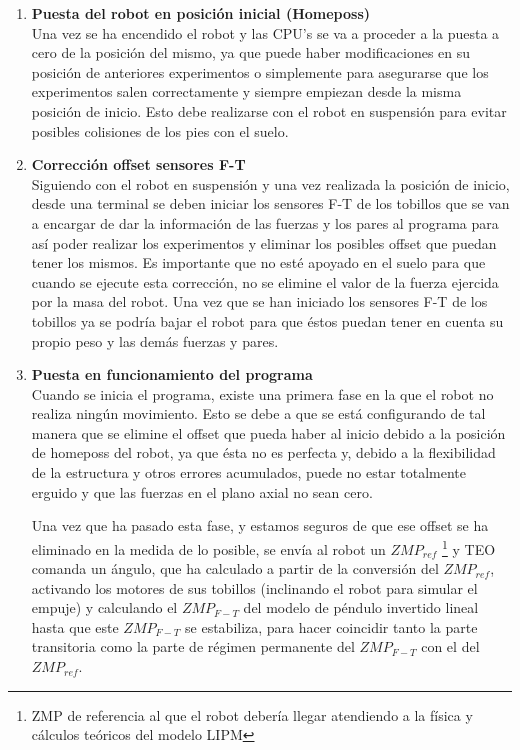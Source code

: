 \begin{enumerate}

\item \textbf{Puesta del robot en posición inicial (Homeposs)}\\ Una vez se ha encendido el robot y las CPU's se va a proceder a la puesta a cero de la posición del mismo, ya que puede haber modificaciones en su posición de anteriores experimentos o simplemente para asegurarse que los experimentos salen correctamente y siempre empiezan desde la misma posición de inicio. Esto debe realizarse con el robot en suspensión para evitar posibles colisiones de los pies con el suelo.

\item \textbf{Corrección offset sensores F-T}\\ Siguiendo con el robot en suspensión y una vez realizada la posición de inicio, desde una terminal se deben iniciar los sensores F-T de los tobillos que se van a encargar de dar la información de las fuerzas y los pares al programa para así poder realizar los experimentos y eliminar los posibles offset que puedan tener los mismos. Es importante que no esté apoyado en el suelo para que cuando se ejecute esta corrección, no se elimine el valor de la fuerza ejercida por la masa del robot. Una vez que se han iniciado los sensores F-T de los tobillos ya se podría bajar el robot para que éstos puedan tener en cuenta su propio peso y las demás fuerzas y pares. 

\item \textbf{Puesta en funcionamiento del programa}\\ Cuando se inicia el programa, existe una primera fase en la que el robot no realiza ningún movimiento. Esto se debe a que se está configurando de tal manera que se elimine el offset que pueda haber al inicio debido a la posición de homeposs del robot, ya que ésta no es perfecta y, debido a la flexibilidad de la estructura y otros errores acumulados, puede no estar totalmente erguido y que las fuerzas en el plano axial no sean cero. 

Una vez que ha pasado esta fase, y estamos seguros de que ese offset se ha eliminado en la medida de lo posible, se envía al robot un $ZMP_{ref}$ \footnote{ZMP de referencia al que el robot debería llegar atendiendo a la física y cálculos teóricos del modelo LIPM} y TEO comanda un ángulo, que ha calculado a partir de la conversión del $ZMP_{ref}$, activando los motores de sus tobillos (inclinando el robot para simular el empuje) y calculando el $ZMP_{F-T}$ del modelo de péndulo invertido lineal hasta que este $ZMP_{F-T}$ se estabiliza, para hacer coincidir tanto la parte transitoria como la parte de régimen permanente del $ZMP_{F-T}$ con el del $ZMP_{ref}$.

\end{enumerate}

